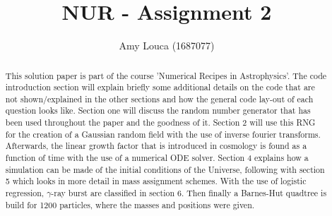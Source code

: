 \documentclass[a4paper,10pt]{article}
\title{\vspace{-2cm}NUR - Assignment 2 }
\author{Amy Louca (1687077)}
\begin{document}
\maketitle

\begin{abstract}
This solution paper is part of the course 'Numerical Recipes in Astrophysics'. The code introduction section will explain briefly some additional details on the code that are not shown/explained in the other sections and how the general code lay-out of each question looks like. Section one will discuss the random number generator that has been used throughout the paper and the goodness of it. Section 2 will use this RNG for the creation of a Gaussian random field with the use of inverse fourier transforms. Afterwards, the linear growth factor that is introduced in cosmology is found as a function of time with the use of a numerical ODE solver. Section 4 explains how a simulation can be made of the initial conditions of the Universe, following with section 5 which looks in more detail in mass assignment schemes. With the use of logistic regression, $\gamma$-ray burst are classified in section 6. Then finally a Barnes-Hut quadtree is build for 1200 particles, where the masses and positions were given.
\end{abstract}








\newpage








%
\end{document}
